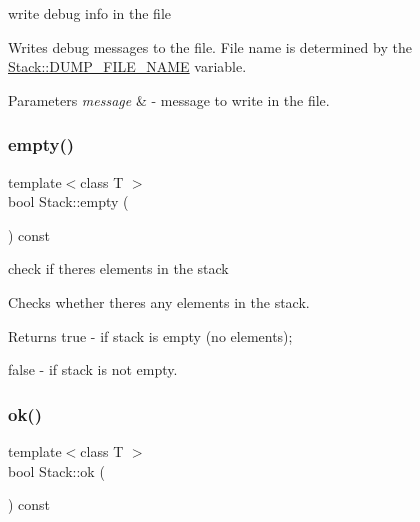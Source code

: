 write debug info in the file 

Writes debug messages to the file. File name is determined by the \hyperlink{class_my_namespace_1_1_stack_a26220dbae7ab40c96d231de833d7fd3a}{Stack\+::\+D\+U\+M\+P\+\_\+\+F\+I\+L\+E\+\_\+\+N\+A\+ME} variable.


\begin{DoxyParams}{Parameters}
{\em message} & -\/ message to write in the file. \\
\hline
\end{DoxyParams}
\mbox{\label{class_my_namespace_1_1_stack_ab76cbabd546dc4ab2859797676ae1a71}} 
\subsubsection{\texorpdfstring{empty()}{empty()}}
{\footnotesize\ttfamily template$<$class T $>$ \\
bool Stack\+::empty (\begin{DoxyParamCaption}{ }\end{DoxyParamCaption}) const}



check if there\textquotesingle{}s elements in the stack 

Checks whether there\textquotesingle{}s any elements in the stack.

\begin{DoxyReturn}{Returns}
{\ttfamily true} -\/ if stack is empty (no elements); 

{\ttfamily false} -\/ if stack is not empty. 
\end{DoxyReturn}
\mbox{\label{class_my_namespace_1_1_stack_a5782682e948051947d47a25b69f7918a}} 
\subsubsection{\texorpdfstring{ok()}{ok()}}
{\footnotesize\ttfamily template$<$class T $>$ \\
bool Stack\+::ok (\begin{DoxyParamCaption}{ }\end{DoxyParamCaption}) const\hspace{0.3cm}{\ttfamily [private]}}



